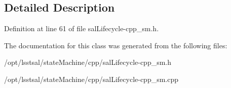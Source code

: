 \subsection{Detailed Description}


Definition at line 61 of file sal\-Lifecycle-\/cpp\-\_\-sm.\-h.



The documentation for this class was generated from the following files\-:\begin{DoxyCompactItemize}
\item 
/opt/lsstsal/state\-Machine/cpp/sal\-Lifecycle-\/cpp\-\_\-sm.\-h\item 
/opt/lsstsal/state\-Machine/cpp/sal\-Lifecycle-\/cpp\-\_\-sm.\-cpp\end{DoxyCompactItemize}
